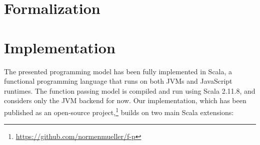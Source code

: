 \documentclass{jfp1}
\begin{document}



\section{Formalization}
\label{sec:formalization}


\section{Implementation}
\label{sec:implementation}

The presented programming model has been fully implemented in Scala, a
functional programming language that runs on both JVMs and JavaScript runtimes.
The function passing model is compiled and run using Scala 2.11.8, and considers
only the JVM backend for now. Our implementation, which has been published as an
open-source project,\footnote{\url{https://github.com/normenmueller/f-p}} builds on two main
Scala extensions:
\end{document}
